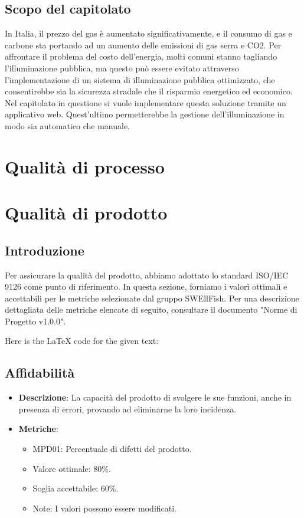 \documentclass[12pt]{article}
\begin{document}
\subsection{Scopo del capitolato}
In Italia, il prezzo del gas è aumentato significativamente, e il consumo di gas e carbone sta portando ad un aumento delle emissioni di gas serra e CO2. Per affrontare il problema del costo dell'energia, molti comuni stanno tagliando l'illuminazione pubblica, ma questo può essere evitato attraverso l'implementazione di un sistema di illuminazione pubblica ottimizzato, che consentirebbe sia la sicurezza stradale che il risparmio energetico ed economico.
Nel capitolato in questione si vuole implementare questa soluzione tramite un applicativo web. Quest'ultimo permetterebbe la gestione dell'illuminazione in modo sia automatico che manuale.
\section{Qualità di processo}
\section{Qualità di prodotto}
\subsection{Introduzione}
Per assicurare la qualità del prodotto, abbiamo adottato lo standard ISO/IEC 9126 come punto di riferimento. In questa sezione, forniamo i valori ottimali e accettabili per le metriche selezionate dal gruppo SWEllFish. Per una descrizione dettagliata delle metriche elencate di seguito, consultare il documento "Norme di Progetto v1.0.0".



Here is the LaTeX code for the given text:

\subsection{Affidabilità}
\begin{itemize}
	\item \textbf{Descrizione}: La capacità del prodotto di svolgere le sue funzioni, anche in presenza di errori, provando ad eliminarne la loro incidenza.
	\item \textbf{Metriche}:
	      \begin{itemize}
		      \item MPD01: Percentuale di difetti del prodotto.
		      \item Valore ottimale: 80\%.
		      \item Soglia accettabile: 60\%.
		      \item Note: I valori possono essere modificati.
	      \end{itemize}
\end{itemize}
\end{document}
